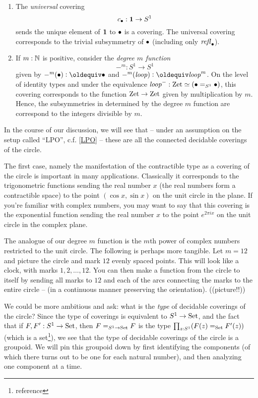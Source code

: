 \begin{example}
  \label{ex:listofS1covers}
  \begin{enumerate}
  \item The \emph{universal} covering  $$c_\bullet:\mathbf{1}\to S^1$$ sends the unique element of $\mathbf{1}$ to $\bullet$ is a covering. The universal covering corresponds to the trivial subsymmetry of $\bullet$ (\ie including only $\mathop{{\it refl}_{\bullet}}$).  
  \item If $m:\mathbb{N}$ is positive, consider the \emph{degree $m$ function} $$-^m:S^1\to S^1$$ given by $-^m(\base)\defequi\base$ and $-^m(\Sloop)\defequi\Sloop^m$.  On the level of identity types and under the equivalence $\mathit{loop}^-:\mathrm{Zet}\simeq(\bullet=_{S^1}\bullet)$, this covering corresponds to the function $\mathrm{Zet}\to\mathrm{Zet}$ given by multiplication by $m$.  Hence, the subsymmetries in determined by the degree $m$ function are correspond to the integers divisible by $m$.
  \end{enumerate}
  In the course of our discussion, we will see that -- under an assumption on the setup called ``LPO'', c.f. \cref{LPO} -- these are all the connected decidable coverings of the circle.
\end{example}

\begin{remark}
  \label{rem:RtoS1}
  The first case, namely the manifestation of the contractible type as a covering of the circle is important in many applications.  Classically it corresponds to the trigonometric functions sending the real number $x$ (the real numbers form a contractible space) to the point $(\cos x,\sin x)$ on the unit circle in the plane.  If you're familiar with complex numbers, you may want to say that this covering is the exponential function sending the real number $x$ to the point $e^{2\pi ix}$ on the unit circle in the complex plane.

  \label{rem:finitecoveringsofS1}
  The analogue of our degree $m$ function is the $m$th power of complex numbers restricted to the unit circle.  The following is perhaps more tangible.  Let $m=12$ and picture the circle and mark $12$ evenly spaced points.  This will look like a clock, with marks $1,2,\dots,12$.  You can then make a function from the circle to itself by sending all marks to $12$ and each of the arcs connecting the marks to the entire circle -- (in a continuous manner preserving the orientation).
  ((picture!!))
\end{remark}

We could be more ambitious and ask: what is the \emph{type} of decidable coverings of the circle?  Since the type of coverings is equivalent to $S^1\to \mathord{\mathrm{Set}}$, and the fact that if $F,F':S^1\to\mathord{\mathrm{Set}}$, then $F=_{S^1\to\mathord{\mathrm{Set}}}F$ is the type $\prod_{z:S^1}(F(z)=_{\mathord{\mathrm{Set}}}F'(z))$ (which is a set\footnote{reference}), we see that the type of decidable coverings of the circle is a groupoid.  We will pin this groupoid down by first identifying the components (of which there turns out to be one for each natural number), and then analyzing one component at a time.

